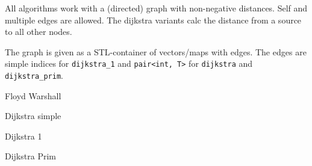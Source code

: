 
All algorithms work with a (directed) graph with non-negative distances.
Self and multiple edges are allowed. The dijkstra variants calc the
distance from a source to all other nodes.

The graph is given as a STL-container of vectors/maps with edges. The edges
are simple indices for {\tt dijkstra\_1} and {\tt pair<int, T>} for
{\tt dijkstra} and {\tt dijkstra\_prim}.

\begin{algorithm}{Floyd Warshall}
\end{algorithm}

\begin{algorithm}{Dijkstra simple}
\end{algorithm}

\begin{algorithm}{Dijkstra 1}
\end{algorithm}

\begin{algorithm}{Dijkstra Prim}
\end{algorithm}
